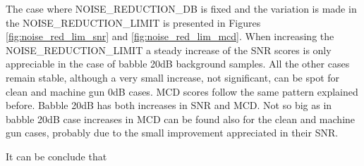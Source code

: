 The case where NOISE\_REDUCTION\_DB is fixed and the variation is made in the NOISE\_REDUCTION\_LIMIT is presented in Figures \ref{fig:noise_red_lim_snr} and \ref{fig:noise_red_lim_mcd}.
%
When increasing the NOISE\_REDUCTION\_LIMIT a steady increase of the SNR scores is only appreciable in the case of babble 20dB background samples.
%
All the other cases remain stable, although a very small increase, not significant, can be spot for clean and machine gun 0dB cases.
%
MCD scores follow the same pattern explained before. 
%
Babble 20dB has both increases in SNR and MCD.
% 
Not so big as in babble 20dB case increases in MCD can be found also for the clean and machine gun cases, probably due to the small improvement appreciated in their SNR.

It can be conclude that 